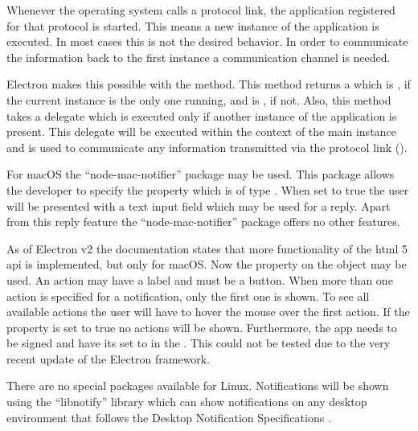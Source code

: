 
Whenever the operating system calls a protocol link, the application registered for that protocol is started. This means a new instance of the application is executed. In most cases this is not the desired behavior. In order to communicate the information back to the first instance a communication channel is needed.


Electron makes this possible with the  method. This method returns a  which is , if the current instance is the only one running, and is , if not. Also, this method takes a delegate which is executed only if another instance of the application is present. This delegate will be executed within the context of the main instance and is used to communicate any information transmitted via the protocol link ().



For macOS the \enquote{node-mac-notifier} package may be used. This package allows the developer to specify the  property which is of type . When set to true the user will be presented with a text input field which may be used for a reply. Apart from this reply feature the \enquote{node-mac-notifier} package offers no other features.

As of Electron v2 the documentation states that more functionality of the \gls{html} 5 \gls{api} is implemented, but only for macOS. Now the  property on the  object may be used. An action may have a label and must be a button. When more than one action is specified for a notification, only the first one is shown. To see all available actions the user will have to hover the mouse over the first action. If the  property is set to true no actions will be shown. Furthermore, the app needs to be signed and have its  set to  in the . This could not be tested due to the very recent update of the Electron framework.


There are no special packages available for Linux. Notifications will be shown using the \enquote{libnotify} library which can show notifications on any desktop environment that follows the Desktop Notification Specifications \cite{desktopNotificationSpec} \cite{electronNotifications}.
